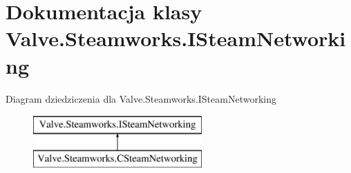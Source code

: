 \hypertarget{class_valve_1_1_steamworks_1_1_i_steam_networking}{}\section{Dokumentacja klasy Valve.\+Steamworks.\+I\+Steam\+Networking}
\label{class_valve_1_1_steamworks_1_1_i_steam_networking}
Diagram dziedziczenia dla Valve.\+Steamworks.\+I\+Steam\+Networking\begin{figure}[H]
\begin{center}
\leavevmode
\includegraphics[height=2.000000cm]{class_valve_1_1_steamworks_1_1_i_steam_networking}
\end{center}
\end{figure}
